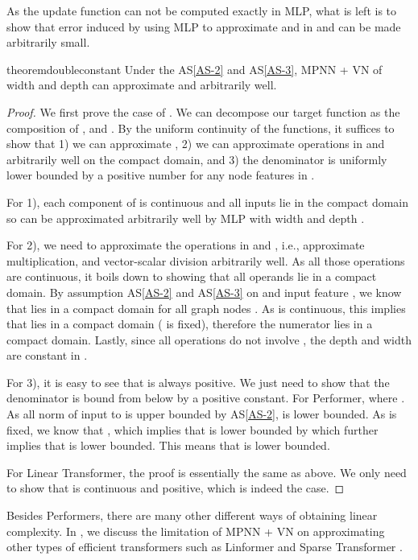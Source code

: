 \documentclass[nohyperref]{article}
\theoremstyle{plain}
\theoremstyle{definition}
\theoremstyle{remark}
\begin{document}
As the update function  can not be computed exactly in MLP, what is left is to show that error induced by using MLP to approximate  and  in  and  can be made arbitrarily small. 


\begin{restatable}{theorem}{doubleconstant}
\label{thm:constant-depth-constant-width}
Under the AS\ref{AS-2} and AS\ref{AS-3}, MPNN + VN of  width and  depth can approximate  and  arbitrarily well. 
\end{restatable}

\begin{proof}
We first prove the case of .
We can decompose our target function as the composition of ,  and . 
By the uniform continuity of the functions, it suffices to show that 1) we can approximate , 2) we can approximate operations in  and  arbitrarily well on the compact domain, and 3) the denominator  is uniformly lower bounded by a positive number for any node features in .

For 1), each component of  is continuous and all inputs  lie in the compact domain so  can be approximated arbitrarily well by MLP with  width and  depth \citep{cybenko1989approximation}. 


For 2), we need to approximate the operations in  and , i.e., approximate multiplication, and vector-scalar division arbitrarily well.  As all those operations are continuous, it boils down to showing that all operands lie in a compact domain. By assumption AS\ref{AS-2} and AS\ref{AS-3} on  and input feature , we know that  lies in a compact domain for all graph nodes . As  is continuous, this implies that  lies in a compact domain ( is fixed), therefore the numerator lies in a compact domain. Lastly, since all operations do not involve , the depth and width are constant in .  

For 3), it is easy to see that  is always positive.  We just need to show that the denominator is bound from below by a positive constant. For Performer,  where . As all norm of input  to  is upper bounded by AS\ref{AS-2},  is lower bounded. As  is fixed, we know that , which implies that  is lower bounded by  which further implies that  is lower bounded. This means that  is lower bounded. 

For Linear Transformer, the proof is essentially the same as above. We only need to show that  is continuous and positive, which is indeed the case. 
\end{proof}

Besides Performers, there are many other different ways of obtaining linear complexity. In , we discuss the limitation of MPNN + VN on approximating other types of efficient transformers such as Linformer \citep{wang2020linformer} and Sparse Transformer \citep{child2019generating}.  
\end{document}
